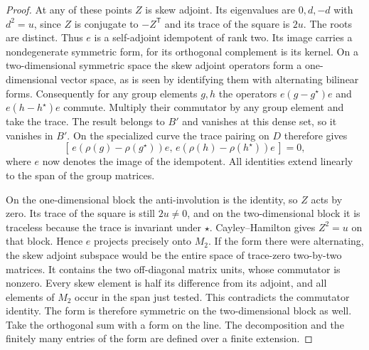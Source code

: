 \documentclass[a4paper,11pt]{article}
\theoremstyle{definition}
\theoremstyle{remark}
\numberwithin{equation}{section}
\begin{document}
\begin{proof}
At any of these points \(Z\) is skew adjoint. Its eigenvalues
are \(0,d,-d\) with \(d^2=u\), since \(Z\) is conjugate to
\(-Z^{\mathsf T}\) and its trace of the square is \(2u\).
The roots are distinct. Thus \(e\) is a self-adjoint idempotent
of rank two. Its image carries a nondegenerate symmetric
form, for its orthogonal complement is its kernel. On a
two-dimensional symmetric space the skew adjoint operators
form a one-dimensional vector space, as is seen by identifying
them with alternating bilinear forms. Consequently for any
group elements \(g,h\) the operators
\(e(g-g^\star)e\) and \(e(h-h^\star)e\) commute. Multiply
their commutator by any group element and take the trace.
The result belongs to \(B'\) and vanishes at this dense set,
so it vanishes in \(B'\). On the specialized curve the trace
pairing on \(D\) therefore gives
\[
        [\,e(\rho(g)-\rho(g^\star))e,\,
             e(\rho(h)-\rho(h^\star))e\,]=0 ,
\]
where \(e\) now denotes the image of the idempotent. All
identities extend linearly to the span of the group matrices.

On the one-dimensional block the anti-involution is the
identity, so \(Z\) acts by zero. Its trace of the square is
still \(2u\ne0\), and on the two-dimensional block it is
traceless because the trace is invariant under \(\star\).
Cayley--Hamilton gives \(Z^2=u\) on that block. Hence \(e\)
projects precisely onto \(M_2\). If the form there were
alternating, the skew adjoint subspace would be the entire
space of trace-zero two-by-two matrices. It contains the two
off-diagonal matrix units, whose commutator is nonzero.
Every skew element is half its difference from its adjoint,
and all elements of \(M_2\) occur in the span just tested.
This contradicts the commutator identity. The form is
therefore symmetric on the two-dimensional block as well.
Take the orthogonal sum with a form on the line. The
decomposition and the finitely many entries of the form
are defined over a finite extension.
\end{proof}
\end{document}
